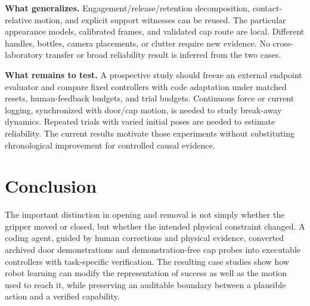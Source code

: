 \textbf{What generalizes.} Engagement/release/retention decomposition,
contact-relative motion, and explicit support witnesses can be reused. The
particular appearance models, calibrated frames, and validated cap route are
local. Different handles, bottles, camera placements, or clutter require new
evidence. No cross-laboratory transfer or broad reliability result is inferred
from the two cases.

\textbf{What remains to test.} A prospective study should freeze an external
endpoint evaluator and compare fixed controllers with code adaptation under
matched resets, human-feedback budgets, and trial budgets. Continuous force
or current logging, synchronized with door/cap motion, is needed to study
break-away dynamics. Repeated trials with varied initial poses are needed to
estimate reliability. The current results motivate those experiments without
substituting chronological improvement for controlled causal evidence.

\section{Conclusion}
The important distinction in opening and removal is not simply whether the
gripper moved or closed, but whether the intended physical constraint changed.
A coding agent, guided by human corrections and physical evidence, converted
archived door demonstrations and demonstration-free cap probes into executable
controllers with task-specific verification. The resulting case studies show
how robot learning can modify the representation of success as well as the
motion used to reach it, while preserving an auditable boundary between a
plausible action and a verified capability.





